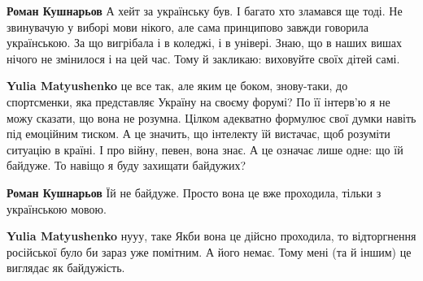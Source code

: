 \begin{itemize}
\begin{itemize}
 
\textbf{Роман Кушнарьов} А хейт за українську був. І багато хто зламався ще
тоді. Не звинувачую у виборі мови нікого, але сама принципово завжди говорила
українською. За що вигрібала і в коледжі, і в універі. Знаю, що в наших вишах
нічого не змінилося і на цей час. Тому й закликаю: виховуйте своїх дітей самі.

 
\textbf{Yulia Matyushenko} це все так, але яким це боком, знову-таки, до
спортсменки, яка представляє Україну на своєму форумі? По її інтерв'ю я не можу
сказати, що вона не розумна. Цілком адекватно формулює свої думки навіть під
емоційним тиском. А це значить, що інтелекту їй вистачає, щоб розуміти ситуацію
в країні. І про війну, певен, вона знає. А це означає лише одне: що їй байдуже.
То навіщо я буду захищати байдужих?

 
\textbf{Роман Кушнарьов} Їй не байдуже. Просто вона це вже проходила, тільки з українською мовою.

 
\textbf{Yulia Matyushenko} нууу, таке \Smiley[1.0][yellow] Якби вона це дійсно проходила, то
відторгнення російської було би зараз уже помітним. А його немає. Тому мені (та
й іншим) це виглядає як байдужість.

 

\end{itemize}
\end{itemize}
